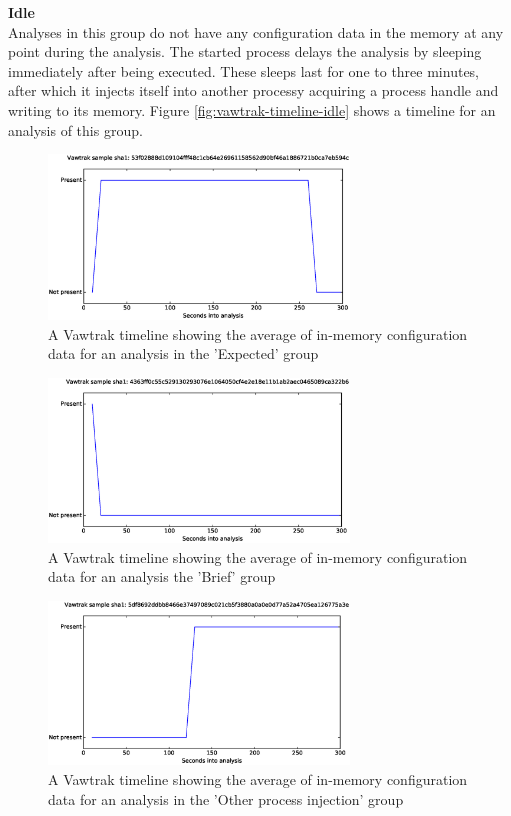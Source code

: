 \documentclass[conference]{IEEEtran}
\begin{document}
\textbf{Idle}
\\Analyses in this group do not have any configuration data in the memory at any point during the analysis. The started process delays the analysis by sleeping immediately after  being executed. These sleeps last for one to three minutes, after which it injects itself into another processy acquiring a process handle and writing to its memory. Figure \ref{fig:vawtrak-timeline-idle} shows a timeline for an analysis of this group.
\newpage

\begin{figure}[h]
    \includegraphics[width=8cm,scale=0.5]{images/vawtrak/vawtrak-timelines-eps/Vawtrak-53f02888d109104fff48c1cb64e26961158562d90bf46a1886721b0ca7eb594c.eps}
    \caption{A Vawtrak timeline showing the average of in-memory configuration data for an analysis in the 'Expected' group}
    \label{fig:vawtrak-timeline-normal}
\end{figure}
\begin{figure}[h]
    \includegraphics[width=8cm,scale=0.5]{images/vawtrak/vawtrak-timelines-eps/Vawtrak-4363ff0c55c529130293076e1064050cf4e2e18e11b1ab2aec0465089ca322b6.eps}
    \caption{A Vawtrak timeline showing the average of in-memory configuration data for an analysis the 'Brief' group}
    \label{fig:vawtrak-timeline-brief}
\end{figure}
\begin{figure}[!h]
    \includegraphics[width=8cm,scale=0.5]{images/vawtrak/vawtrak-timelines-eps/Vawtrak-5df8692ddbb8466e37497089c021cb5f3880a0a0e0d77a52a4705ea126775a3e.eps}
    \caption{A Vawtrak timeline showing the average of in-memory configuration data for an analysis in the 'Other process injection' group}
    \label{fig:vawtrak-timeline-injection}
\end{figure}
\end{document}
